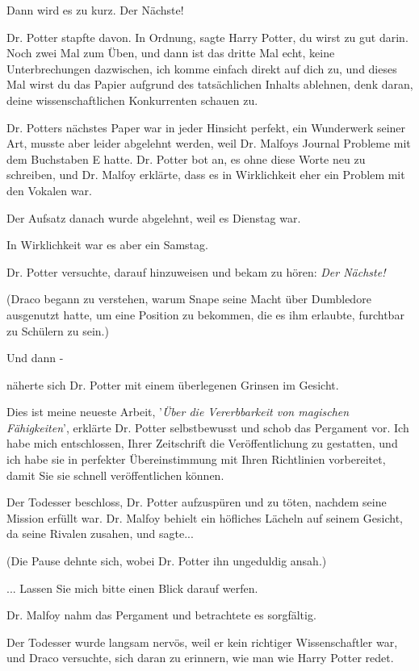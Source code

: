 \glqq{}Dann wird es zu kurz. Der Nächste!\grqq{}

Dr. Potter stapfte davon. \glqq{}In Ordnung\grqq{}, sagte Harry Potter, \glqq{}du
wirst zu gut darin. Noch zwei Mal zum Üben, und dann ist das dritte Mal echt,
keine Unterbrechungen dazwischen, ich komme einfach direkt auf dich zu, und
dieses Mal wirst du das Papier aufgrund des tatsächlichen Inhalts ablehnen, denk
daran, deine wissenschaftlichen Konkurrenten schauen zu.\grqq{}

Dr. Potters nächstes Paper war in jeder Hinsicht perfekt, ein Wunderwerk seiner
Art, musste aber leider abgelehnt werden, weil Dr. Malfoys Journal Probleme mit
dem Buchstaben E hatte. Dr. Potter bot an, es ohne diese Worte neu zu schreiben,
und Dr. Malfoy erklärte, dass es in Wirklichkeit eher ein Problem mit den
Vokalen war.

Der Aufsatz danach wurde abgelehnt, weil es Dienstag war.

In Wirklichkeit war es aber ein Samstag.

Dr. Potter versuchte, darauf hinzuweisen und bekam zu hören: \emph{\glqq{}Der
Nächste!\grqq{}}

(Draco begann zu verstehen, warum Snape seine Macht über Dumbledore ausgenutzt
hatte, um eine Position zu bekommen, die es ihm erlaubte, furchtbar zu Schülern
zu sein.)

Und dann -

näherte sich Dr. Potter mit einem überlegenen Grinsen im Gesicht.

\glqq{}Dies ist meine neueste Arbeit, '\emph{Über die Vererbbarkeit von magischen
Fähigkeiten}', erklärte Dr. Potter selbstbewusst und schob das Pergament vor.
\glqq{}Ich habe mich entschlossen, Ihrer Zeitschrift die Veröffentlichung zu
gestatten, und ich habe sie in perfekter Übereinstimmung mit Ihren Richtlinien
vorbereitet, damit Sie sie schnell veröffentlichen können.\grqq{}

Der Todesser beschloss, Dr. Potter aufzuspüren und zu töten, nachdem seine
Mission erfüllt war. Dr. Malfoy behielt ein höfliches Lächeln auf seinem
Gesicht, da seine Rivalen zusahen, und sagte...

(Die Pause dehnte sich, wobei Dr. Potter ihn ungeduldig ansah.)

... \glqq{}Lassen Sie mich bitte einen Blick darauf werfen.\grqq{}

Dr. Malfoy nahm das Pergament und betrachtete es sorgfältig.

Der Todesser wurde langsam nervös, weil er kein richtiger Wissenschaftler war,
und Draco versuchte, sich daran zu erinnern, wie man wie Harry Potter redet.

